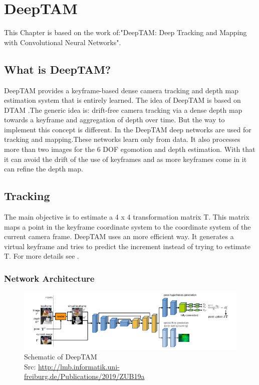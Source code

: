 \chapter{DeepTAM\authorB} \label{ref:deeptam}

This Chapter is based on the work of:"DeepTAM: Deep Tracking and Mapping with Convolutional Neural Networks".\cite{ZUB19a}

\section{What is DeepTAM?}
DeepTAM provides a keyframe-based dense camera tracking and depth map estimation system that is entirely learned. The idea of DeepTAM is based on DTAM \cite{dtam}.The generic idea is: drift-free camera tracking via a dense depth map towards a keyframe and aggregation of depth over time. But the way to implement this concept is different. In the DeepTAM deep networks are used for tracking and mapping.These networks learn only from data. It also processes more than two images for the 6 DOF egomotion and depth estimation. With that it can avoid the drift of the use of keyframes and as more keyframes come in it can refine the depth map.

\section{Tracking}
The main objective is to estimate a 4 x 4 transformation matrix T. This matrix maps a point in the keyframe coordinate system to the coordinate system of the current camera frame. DeepTAM uses an more efficient way. It generates a virtual keyframe and tries to predict the increment instead of trying to estimate T. For more details see \cite{ZUB19a}. 

\subsection{Network Architecture}

\begin{figure}[h]
	\centering
	\includegraphics[width=1.1\textwidth]{./media/images/DeepTAM_schematic.PNG}
  	\caption{Schematic of DeepTAM
  	\\Src: \url{http://lmb.informatik.uni-freiburg.de/Publications/2019/ZUB19a}}
  	\label{DeepTAMschematic}
\end{figure}

